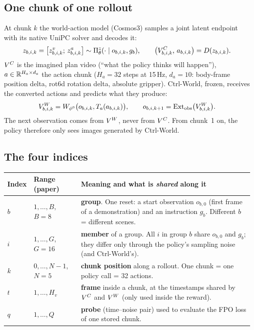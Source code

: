 \subsection{One chunk of one rollout}
At chunk $k$ the world-action model (Cosmos3) samples a joint latent endpoint with its native UniPC solver and decodes it:
\begin{equation}
z_{b,i,k}=\big[z^{v}_{b,i,k};\,z^{a}_{b,i,k}\big]\sim \Pi^{z}_{\theta}(\cdot\mid o_{b,i,k},g_b),\qquad
\big(V^{C}_{b,i,k},\,a_{b,i,k}\big)=D(z_{b,i,k}).
\end{equation}
$V^{C}$ is the imagined plan video (``what the policy thinks will happen''), $a\in\mathbb{R}^{H_a\times d_a}$ the action chunk ($H_a=32$ steps at 15\,Hz, $d_a=10$: body-frame position delta, rot6d rotation delta, absolute gripper). Ctrl-World, frozen, receives the converted actions and predicts what they produce:
\begin{equation}
V^{W}_{b,i,k}=W_{\phi^0}\big(o_{b,i,k},T_a(a_{b,i,k})\big),\qquad o_{b,i,k+1}=\mathrm{Ext}_{\mathrm{obs}}\big(V^{W}_{b,i,k}\big).
\end{equation}
The next observation comes from $V^{W}$, never from $V^{C}$. From chunk~1 on, the policy therefore only sees images generated by Ctrl-World.

\subsection{The four indices}
\begin{center}
\small
\begin{tabularx}{\linewidth}{@{}l l Y@{}}
\toprule
Index & Range (paper) & Meaning and what is \emph{shared} along it\\
\midrule
$b$ & $1,\dots,B$, $B=8$ & \textbf{group}. One reset: a start observation $o_{b,0}$ (first frame of a demonstration) and an instruction $g_b$. Different $b$ = different scenes.\\
$i$ & $1,\dots,G$, $G=16$ & \textbf{member} of a group. All $i$ in group $b$ share $o_{b,0}$ and $g_b$; they differ only through the policy's sampling noise (and Ctrl-World's).\\
$k$ & $0,\dots,N-1$, $N=5$ & \textbf{chunk position} along a rollout. One chunk = one policy call = 32 actions.\\
$t$ & $1,\dots,H_v$ & \textbf{frame} inside a chunk, at the timestamps shared by $V^{C}$ and $V^{W}$ (only used inside the reward).\\
$q$ & $1,\dots,Q$ & \textbf{probe} (time--noise pair) used to evaluate the FPO loss of one stored chunk.\\
\bottomrule
\end{tabularx}
\end{center}

